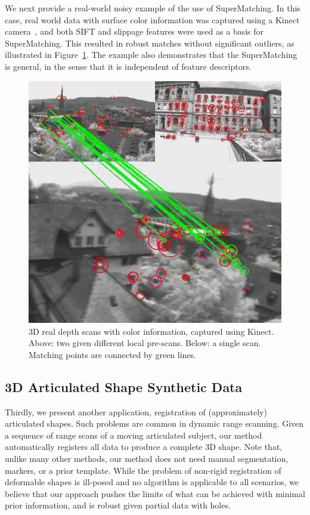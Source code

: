 We next provide a real-world noisy example of the use of SuperMatching.
In this case, real world data with surface color information was captured using a Kinect camera~\cite{Kinect12},
and both SIFT and slippage features were used as a basis for SuperMatching.
This resulted in robust matches without significant outliers, as illustrated in Figure~\ref{fig:3DReal}.
The example also demonstrates that the SuperMatching is general, in the sense that it is independent of feature descriptors.

\begin{figure}[h]
\centering
  \includegraphics[width=0.9\linewidth]{figures/3DReal.jpg}
  \caption{3D real depth scans with color information, captured using Kinect.
  Above: two given different local pre-scans.  Below: a single scan.
  Matching points are connected by green lines.}
\label{fig:3DReal}
\end{figure}

\subsection{3D Articulated Shape Synthetic Data}
\label{subsec:3darticulated}

Thirdly, we present another application, registration of (approximately) articulated shapes. Such problems are common in dynamic range scanning.
Given a sequence of range scans of a moving articulated subject, our method automatically registers all data to produce a complete 3D shape.
Note that, unlike many other methods, our method does not need  manual segmentation,  markers, or a prior template.
While the problem of non-rigid registration of deformable shapes is ill-posed and no algorithm is applicable to all scenarios,
we believe that our approach pushes the limits of what can be achieved with minimal prior information, and is robust given partial data with holes.

